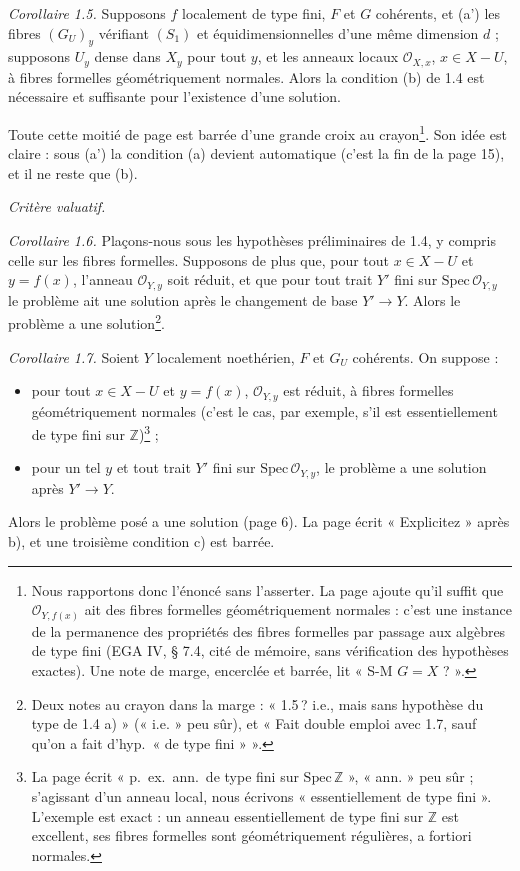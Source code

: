 \documentclass[11pt,a4paper]{article}
\begin{document}
\emph{Corollaire 1.5.} Supposons $f$ localement de type fini, $F$ et $G$
cohérents, et (a') les fibres $(G_U)_y$ vérifiant $(S_1)$ et équidimensionnelles
d'une même dimension $d$ ; supposons $U_y$ dense dans $X_y$ pour tout $y$, et
les anneaux locaux $\mathcal{O}_{X,x}$, $x \in X - U$, à fibres formelles
géométriquement normales. Alors la condition (b) de 1.4 est nécessaire et
suffisante pour l'existence d'une solution.

Toute cette moitié de page est barrée d'une grande croix au
crayon\footnote{Nous rapportons donc l'énoncé sans l'asserter. La page ajoute
qu'il suffit que $\mathcal{O}_{Y,f(x)}$ ait des fibres formelles
géométriquement normales : c'est une instance de la permanence des propriétés
des fibres formelles par passage aux algèbres de type fini (EGA IV, § 7.4,
cité de mémoire, sans vérification des hypothèses exactes). Une note de marge,
encerclée et barrée, lit « S-M $G = X$ ? ».}. Son idée est claire : sous (a')
la condition (a) devient automatique (c'est la fin de la page 15), et il ne
reste que (b).

\emph{Critère valuatif.}

\emph{Corollaire 1.6.} Plaçons-nous sous les hypothèses préliminaires de 1.4,
y compris celle sur les fibres formelles. Supposons de plus que, pour tout
$x \in X - U$ et $y = f(x)$, l'anneau $\mathcal{O}_{Y,y}$ soit réduit, et que
pour tout trait $Y'$ fini sur $\mathrm{Spec}\, \mathcal{O}_{Y,y}$ le problème
ait une solution après le changement de base $Y' \to Y$. Alors le problème a
une solution\footnote{Deux notes au crayon dans la marge : « 1.5\,? i.e.,
mais sans hypothèse du type de 1.4 a) » (« i.e. » peu sûr), et « Fait double emploi avec 1.7,
sauf qu'on a fait d'hyp.\ « de type fini » ».}.

\emph{Corollaire 1.7.} Soient $Y$ localement noethérien, $F$ et $G_U$
cohérents. On suppose :
\begin{itemize}
  \item[a)] pour tout $x \in X - U$ et $y = f(x)$, $\mathcal{O}_{Y,y}$ est
  réduit, à fibres formelles géométriquement normales (c'est le cas, par
  exemple, s'il est essentiellement de type fini sur $\mathbb{Z}$)\footnote{La
  page écrit « p.\ ex.\ ann.\ de type fini sur $\mathrm{Spec}\,
  \mathbb{Z}$ », « ann. » peu sûr ; s'agissant d'un anneau local, nous
  écrivons « essentiellement de type fini ». L'exemple est exact : un anneau
  essentiellement de type fini sur $\mathbb{Z}$ est excellent, ses fibres
  formelles sont géométriquement régulières, a fortiori normales.} ;
  \item[b)] pour un tel $y$ et tout trait $Y'$ fini sur
  $\mathrm{Spec}\, \mathcal{O}_{Y,y}$, le problème a une solution après
  $Y' \to Y$.
\end{itemize}
Alors le problème posé a une solution (page 6). La page écrit « Explicitez »
après b), et une troisième condition c) est barrée.
\end{document}
